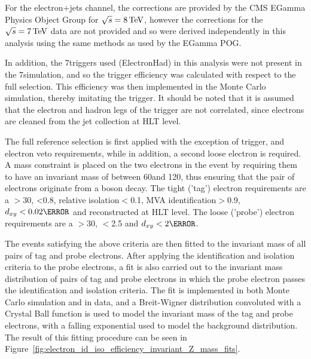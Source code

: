 For the electron+jets channel, the corrections are provided by the CMS EGamma Physics Object Group for
$\sqrt{s}=8\,\text{Te\hspace{-.08em}V}$, however the corrections for the $\sqrt{s}=7\,\text{Te\hspace{-.08em}V}$ data are not provided and so were derived
independently in this analysis using the same methods as used by the EGamma POG.

In addition, the 7\TeV triggers used (ElectronHad) in this analysis were not present in the 7\TeV simulation,
and so the trigger efficiency was calculated with respect to the full selection. This efficiency was then implemented in
the Monte Carlo simulation, thereby imitating the trigger. It should be noted that it is assumed that the
electron and hadron legs of the trigger are not correlated, since electrons are cleaned from the jet
collection at HLT level.

The full reference selection is first applied with the exception of trigger, \btagging and electron veto
requirements, while in addition, a second loose electron is required. A \Z mass constraint is placed on the
two electrons in the event by requiring them to have an invariant mass of between 60\GeV and 120\GeV, thus
ensuring that the pair of electrons originate from a \Z boson decay. The tight ('tag') electron requirements
are a \pt$>$30\GeV, \abseta<0.8, relative isolation$<$0.1, MVA identification$>$0.9, $d_{xy}<0.02\cm$ and
reconstructed at HLT level. The loose ('probe') electron requirements are a \pt$>$30\GeV, \abseta$<$2.5 and
$d_{xy}<2\cm$.

The events satisfying the above criteria are then fitted to the invariant mass of all pairs of tag and probe
electrons. After applying the identification and isolation criteria to the probe electrons, a fit is also
carried out to the invariant mass distribution of pairs of tag and probe electrons in which the probe electron
passes the identification and isolation criteria. The fit is implemented in both Monte Carlo simulation
and in data, and a Breit-Wigner distribution convoluted with a Crystal Ball function is used to model the
invariant mass of the tag and probe electrons, with a falling exponential used to model the background
distribution. The result of this fitting procedure can be seen in
Figure~\ref{fig:electron_id_iso_efficiency_invariant_Z_mass_fits}.

